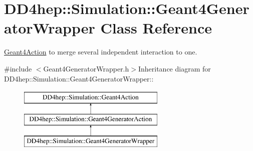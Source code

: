 \hypertarget{class_d_d4hep_1_1_simulation_1_1_geant4_generator_wrapper}{
\section{DD4hep::Simulation::Geant4GeneratorWrapper Class Reference}
\label{class_d_d4hep_1_1_simulation_1_1_geant4_generator_wrapper}
}


\hyperlink{class_d_d4hep_1_1_simulation_1_1_geant4_action}{Geant4Action} to merge several independent interaction to one.  


{\ttfamily \#include $<$Geant4GeneratorWrapper.h$>$}Inheritance diagram for DD4hep::Simulation::Geant4GeneratorWrapper::\begin{figure}[H]
\begin{center}
\leavevmode
\includegraphics[height=3cm]{class_d_d4hep_1_1_simulation_1_1_geant4_generator_wrapper}
\end{center}
\end{figure}
